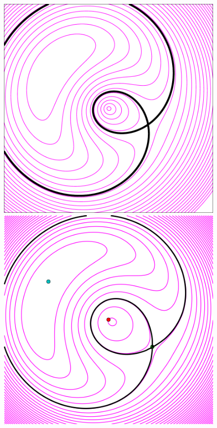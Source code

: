 \documentclass[usenatbib]{mn2e}
\newlength{\myplotswidth}
\begin{document}
\begin{figure}
  \includegraphics[width=\myplotswidth]{fig/ASW000102p_006941_arriv} 
  \includegraphics[width=\myplotswidth]{fig/006941_spaghetti} \\

\end{figure}
\end{document}
